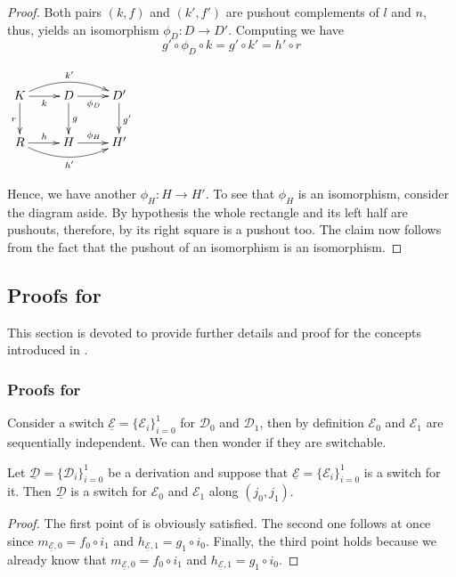 \documentclass[a4paper,UKenglish,cleveref,pdftex, thm-restate,numberwithinsect,anonymous]{lipics}
\newcommand{\dder}[1]{\mathscr{#1}}
\newcommand{\der}[1]{\underline{\dder{#1}}}
\begin{document}
\propUnique*

\label{propUnique-proof}
\begin{proof}
  Both pairs $(k, f)$ and $(k', f')$ are pushout complements of $l$
  and $n$, thus,  yields an isomorphism
  $\phi_D\colon D\to D'$. Computing we have
  \[
    g'\circ \phi_D \circ k= g' \circ k'=h'\circ r
  \]

  \noindent
  \parbox{3cm}{
    $\xymatrix{K \ar@/^.4cm/[rr]^{k'}\ar[d]_{r} \ar[r]_{k}&
      \ar[r]_{\phi_D} D \ar[d]^{g}& D' \ar[d]^{g'}\\ R
      \ar@/_.4cm/[rr]_{h'} \ar[r]^{h}& H \ar[r]^{\phi_H}& H'}$}
  \hfill
  \parbox{10cm}{ \hspace{15pt}Hence, we have another
    $\phi_H\colon H\to H'$. To see that $\phi_H$ is an isomorphism,
    consider the diagram aside. By hypothesis the whole rectangle and
    its left half are pushouts, therefore, by  its right
    square is a pushout too. The claim now follows from the fact that
    the pushout of an isomorphism is an isomorphism. \qedhere }
\end{proof}


\subsection{Proofs for }

This section is devoted to provide further details and proof for the concepts introduced in .

\subsubsection{Proofs for }


Consider a switch $\der{E}=\{\dder{E}_i\}_{i=0}^1$ for $\dder{D}_0$
and $\dder{D}_1$, then by definition $\dder{E}_0$ and $\dder{E}_1$ are
sequentially independent. We can then wonder if they are switchable.

\begin{proposition}
  \label{prop:switch}
  Let $\der{D}=\{\dder{D}_i\}_{i=0}^1$ be a derivation and suppose
  that $\der{E}=\{\dder{E}_i\}_{i=0}^1$ is a switch for it. Then
  $\der{D}$ is a switch for $\dder{E}_0$ and $\dder{E}_1$ along
  $(j_0, j_1)$.
\end{proposition}

\begin{proof}
    The first point of  is obviously satisfied. The
    second one follows at once since $m_{\der{E},0}= f_0\circ i_1$ and $h_{\der{E},1}= g_{1}\circ i_0$.    Finally, the third point holds because we already know that $m_{\der{E},0}= f_0\circ i_1$ and $h_{\der{E},1}= g_{1}\circ i_0$.
\end{proof}
\end{document}
